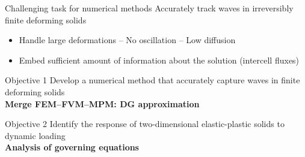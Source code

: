 \begin{withoutheadline}
  \begin{frame}{\text{  }}
    \begin{block}{Challenging task for numerical methods}
      \alert{Accurately track waves in irreversibly finite deforming solids}
      \begin{itemize}
      \item[1-] Handle large deformations -- No oscillation -- Low diffusion
      \item[2-] Embed sufficient amount of information about the solution (intercell fluxes)
      \end{itemize}
    \end{block}\pause 
    
    \begin{block}{Objective 1}
      Develop a numerical method that accurately capture waves in finite deforming solids \\
      \textbf{Merge FEM--FVM--MPM: DG approximation}
    \end{block}\pause
    \begin{block}{Objective 2}
      Identify the response of two-dimensional elastic-plastic solids to dynamic loading \\
      \textbf{Analysis of governing equations} %
    \end{block}
  \end{frame}
\end{withoutheadline}




